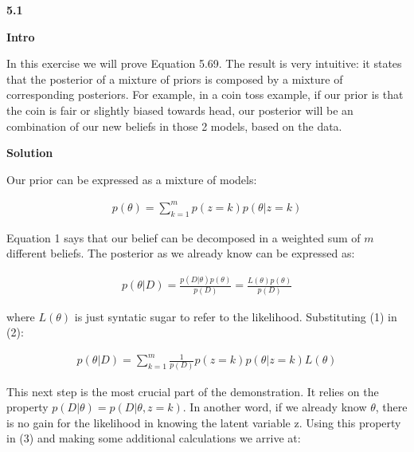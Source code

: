 \documentclass[a4paper,10pt]{book}
\begin{document}
\textbf{5.1}

\textbf{Intro} \par

In this exercise we will prove Equation 5.69. The result is very intuitive: it states that the posterior of a mixture of priors is composed
by a mixture of corresponding posteriors. For example, in a coin toss example, if our prior is that the coin is fair or slightly biased towards head,
our posterior will be an combination of our new beliefs in those 2 models, based on the data.
\par


\textbf{Solution} \par

Our prior can be expressed as a mixture of models:


\begin{equation}
\begin{split}
p(\theta) = \sum_{k=1}^mp(z=k)p(\theta|z=k)
\end{split}
\end{equation}

Equation 1 says that our belief can be decomposed in a weighted sum of $m$ different beliefs. The posterior as we already know can
be expressed as:

\begin{equation}
\begin{split}
p(\theta | D) = \frac{p(D | \theta)  p(\theta)}{p(D)} = \frac{L(\theta) p(\theta)}{p(D)}
\end{split}
\end{equation}

where $L(\theta)$ is just syntatic sugar to refer to the likelihood. Substituting (1) in (2):

\begin{equation}
\begin{split}
p(\theta | D) =  \sum_{k=1}^m \frac{1}{p(D)} p(z=k)p(\theta|z=k)L(\theta) 
\end{split}
\end{equation}

This next step is the most crucial part of the demonstration. It  relies on the property $p(D |\theta) = p(D |\theta, z=k)$.
In another word, if we already know $\theta$, there is no gain for the likelihood in knowing the latent variable z. Using this property
in (3) and making some additional calculations we arrive at:
\end{document}
